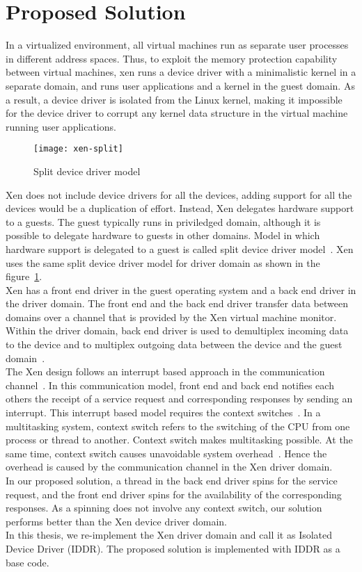 \section {Proposed Solution} 

In a virtualized environment, all virtual machines run as separate user processes in different address spaces. Thus, to exploit the memory protection capability between virtual machines, xen runs a device driver with a minimalistic kernel in a separate domain, and runs user applications and a kernel in the guest domain. As a result, a device driver is isolated from the Linux kernel, making it impossible for the device driver to corrupt any kernel data structure in the virtual machine running user applications. 
\begin{figure}[!ht]
\centering
\texttt{[image: xen-split]}
\caption{Split device driver model}
\label{fig:xen-split}
\end{figure}
Xen does not include device drivers for all the devices, adding support for all the devices would be a duplication of effort. Instead, Xen delegates hardware support to a guests. The guest typically runs in priviledged domain, although it is possible to delegate hardware to guests in other domains. Model in which hardware support is delegated to a guest is called split device driver model~\cite{Chisnall:2007:DGX:1407351}. Xen uses the same split device driver model for driver domain as shown in the figure~\ref{fig:xen-split}.
\\
Xen has a front end driver in the guest operating system and a back end driver in the driver domain. The front end and the back end driver transfer data between domains over a channel that is provided by the Xen virtual machine monitor. Within the driver domain, back end driver is used to demultiplex incoming data to the device and to multiplex outgoing data between the device and the guest domain~\cite{driverdomain}.
\\
The Xen design follows an interrupt based approach in the communication channel~\cite{Barham:2003:XAV:945445.945462}. In this communication model, front end and back end notifies each others the receipt of a service request and corresponding responses by sending an interrupt. This interrupt based model requires the context switches~\cite{Barham:2003:XAV:945445.945462}. In a multitasking system, context switch refers to the switching of the CPU from one process or thread to another. Context switch makes multitasking possible. At the same time, context switch causes unavoidable system overhead~\cite{Li:2007:QCC:1281700.1281702, Mogul:1991:ECS:106973.106982}. Hence the overhead is caused by the communication channel in the Xen driver domain. 
\\
In our proposed solution, a thread in the back end driver spins for the service request, and the front end driver spins for the availability of the corresponding responses. As a spinning does not involve any context switch, our solution performs better than the Xen device driver domain. 
\\
In this thesis, we re-implement the Xen driver domain and call it as Isolated Device Driver (IDDR). The proposed solution is implemented with IDDR as a base code.
\pagebreak

